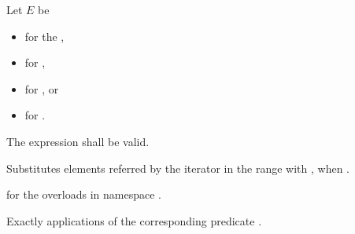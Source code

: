 \begin{itemdescr}
\begin{addedblock}
\pnum
Let $E$ be
\begin{itemize}
\item {} for the ,
\item {} for ,
\item {} for , or
\item {} for .
\end{itemize}
\end{addedblock}

\pnum
\requires
The expression
shall be valid.

\pnum
\effects
Substitutes elements referred by the iterator
in the range 
with ,
when 
.

\begin{addedblock}
\pnum
\returns
{} for the overloads in namespace .
\end{addedblock}

\pnum
\complexity
Exactly
applications of the corresponding predicate .
\end{itemdescr}


